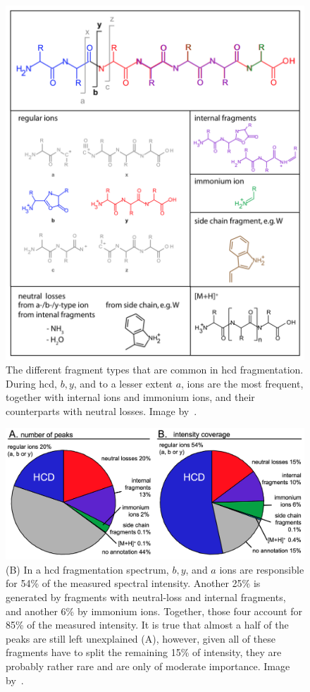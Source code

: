 \begin{figure}
  \centering
  \includegraphics[width=.9\linewidth]{img/fragment-types-hcd.png}
  \caption{The different fragment types that are common in \gls*{hcd} fragmentation. During \gls*{hcd}, \(b, y\), and to a lesser extent \(a\), ions are the most frequent, together with internal ions and immonium ions, and their counterparts with neutral losses. Image by~\citet{michalski2012systematic}.}\label{fig:fragment-types-hcd}
\end{figure}

\begin{figure}
  \centering
  \includegraphics[width=.9\linewidth]{img/hcd.png}
  \caption{(B) In a \gls*{hcd} fragmentation spectrum, \(b, y\), and \(a\) ions are responsible for 54\% of the measured spectral intensity. Another 25\% is generated by fragments with neutral-loss and internal fragments, and another 6\% by immonium ions. Together, those four account for 85\% of the measured intensity. It is true that almost a half of the peaks are still left unexplained (A), however, given all of these fragments have to split the remaining 15\% of intensity, they are probably rather rare and are only of moderate importance. Image by~\citet{michalski2012systematic}.}\label{fig:hcd}
\end{figure}

